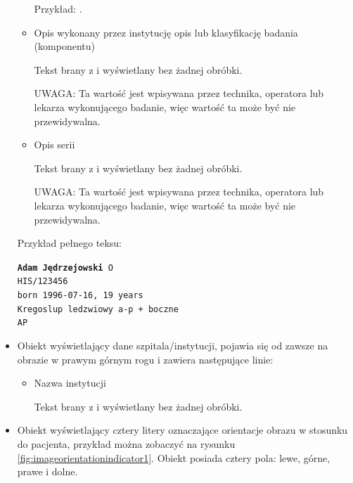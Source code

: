 \begin{itemize}
\begin{itemize}
        Przykład: .

        \item Opis wykonany przez instytucję opis lub klasyfikację badania (komponentu)
        
        Tekst brany z  i wyświetlany bez żadnej obróbki.

        UWAGA: Ta wartość jest wpisywana przez technika, operatora lub lekarza wykonującego badanie, więc wartość ta może być nie przewidywalna.

        \item Opis serii
        
        Tekst brany z  i wyświetlany bez żadnej obróbki.
        
        UWAGA: Ta wartość jest wpisywana przez technika, operatora lub lekarza wykonującego badanie, więc wartość ta może być nie przewidywalna.
    \end{itemize}

    Przykład pełnego teksu:
    
    \texttt{\textbf{Adam Jędrzejowski} O\\
    HIS/123456\\
    born 1996-07-16, 19 years\\
    Kregoslup ledzwiowy a-p + boczne\\
    AP
    }
    
    \item {}
    
    Obiekt wyświetlający dane szpitala/instytucji, pojawia się od zawsze na obrazie w prawym górnym rogu i zawiera następujące linie:
    \begin{itemize}
        \item Nazwa instytucji
        
        Tekst brany z  i wyświetlany bez żadnej obróbki.
        
    \end{itemize}

    \item {}

    Obiekt wyświetlający cztery litery oznaczające orientacje obrazu w stosunku do pacjenta, przykład można zobaczyć na rysunku \ref{fig:imageorientationindicator1}.
    Obiekt posiada cztery pola: lewe, górne, prawe i dolne.


\end{itemize}
